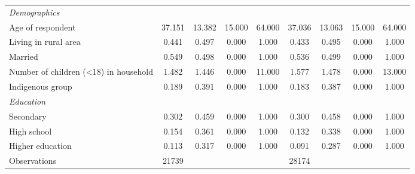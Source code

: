 \documentclass[12pt,english,british]{article}
\begin{document}
\begin{table}[h]
\begin{center}
\begin{adjustbox}{max width=\textwidth}
{\begin{tabular}{l*{2}{cccc}}
\hspace*{10mm}\emph{Demographics}&&&&&&&& \\
Age of respondent   &      37.151&      13.382&      15.000&      64.000&      37.036&      13.063&      15.000&      64.000\\
Living in rural area&       0.441&       0.497&       0.000&       1.000&       0.433&       0.495&       0.000&       1.000\\
Married             &       0.549&       0.498&       0.000&       1.000&       0.536&       0.499&       0.000&       1.000\\
Number of children (<18) in household&       1.482&       1.446&       0.000&      11.000&       1.577&       1.478&       0.000&      13.000\\
Indigenous group    &       0.189&       0.391&       0.000&       1.000&       0.183&       0.387&       0.000&       1.000\\
\hspace*{10mm}\emph{Education}&&&&&&&& \\
Secondary           &       0.302&       0.459&       0.000&       1.000&       0.300&       0.458&       0.000&       1.000\\
High school         &       0.154&       0.361&       0.000&       1.000&       0.132&       0.338&       0.000&       1.000\\
Higher education    &       0.113&       0.317&       0.000&       1.000&       0.091&       0.287&       0.000&       1.000\\
\midrule
Observations        &       21739&            &            &            &       28174&            &            &            \\
\bottomrule
\end{tabular}%
}
\end{adjustbox}
\end{center}


\end{table}
\end{document}

